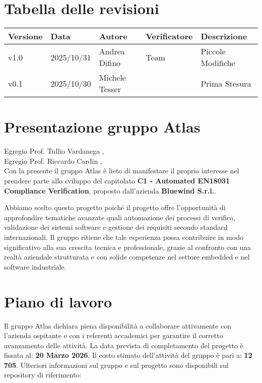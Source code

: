 \documentclass[a4paper,12pt]{article}
\newcommand{\VersioneDocumento}{v1.0} %
\begin{document}
\section*{Tabella delle revisioni}
    \begin{center} 
        \begin{tabular}{|l|l|l|l|l|}
            \hline
            \textbf{Versione} & \textbf{Data} & \textbf{Autore} & \textbf{Verificatore} & \textbf{Descrizione} \\
            \hline
            \VersioneDocumento & 2025/10/31 & Andrea Difino & Team & Piccole Modifiche \\
            \hline
            v0.1 & 2025/10/30 & Michele Tesser & & Prima Stesura \\
            \hline
        \end{tabular}
    \end{center}


\newpage

\section*{Presentazione gruppo Atlas}

Egregio Prof. Tullio Vardanega ,\\
Egregio Prof. Riccardo Cardin ,\\

\noindent Con la presente il gruppo Atlas è lieto di manifestare il proprio interesse nel prendere parte allo sviluppo del capitolato \textbf{C1 - Automated EN18031 Compliance Verification}, proposto dall'azienda \textbf{Bluewind S.r.l.}.

Abbiamo scelto questo progetto poiché il progetto offre l'opportunità di approfondire tematiche avanzate quali automazione dei processi di verifica, validazione dei sistemi software e gestione dei requisiti secondo standard internazionali. Il gruppo ritiene che tale esperienza possa contribuire in modo significativo alla sua crescita tecnica e professionale, grazie al confronto con una realtà aziendale strutturata e con solide competenze nel settore embedded e nel software industriale.

\section*{Piano di lavoro}

Il gruppo Atlas dichiara piena disponibilità a collaborare attivamente con l'azienda ospitante e con i referenti accademici per garantire il corretto avanzamento delle attività.
La data prevista di completamento del progetto è fissata al: \textbf{20 Marzo 2026}.
Il costo stimato dell'attività del gruppo è pari a: \textbf{12 705\texteuro}.
Ulteriori informazioni sul gruppo e sul progetto sono disponibili sul repository di riferimento:
\end{document}
